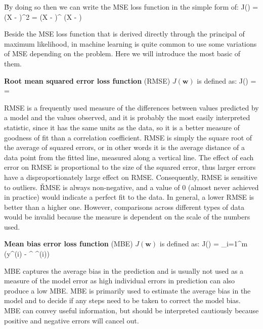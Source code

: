 \v

By doing so then we can write the MSE loss function in the simple form of:
\bse
J() =  (X  - )^2 =
 (X  - )^{\intercal} (X  - )
\ese

Beside the MSE loss function that is derived directly through the principal of maximum likelihood, in machine
learning is quite common to use some variations of MSE depending on the problem. Here we will introduce the most
basic of them.

\textbf{Root mean squared error loss function} (RMSE) $J(\boldsymbol{w})$ is defined as:
\bse
J() =  = 
\ese
\ed

RMSE is a frequently used measure of the differences between values predicted by a model and the values observed, and
it is probably the most easily interpreted statistic, since it has the same units as the data, so it is a better
measure of goodness of fit than a correlation coefficient. RMSE is simply the square root of the average of squared
errors, or in other words it is the average distance of a data point from the fitted line, measured along a vertical
line. The effect of each error on RMSE is proportional to the size of the squared error, thus larger errors have a
disproportionately large effect on RMSE. Consequently, RMSE is sensitive to outliers. \v

RMSE is always non-negative, and a value of 0 (almost never achieved in practice) would indicate a perfect fit to the
data. In general, a lower RMSE is better than a higher one. However, comparisons across different types of data would
be invalid because the measure is dependent on the scale of the numbers used.

\textbf{Mean bias error loss function} (MBE) $J(\boldsymbol{w})$ is defined as:
\bse
J() =  \sum_{i=1}^{m} (y^{(i)} - ^{\intercal} ^{(i)})
\ese
\ed

MBE captures the average bias in the prediction and is usually not used as a measure of the model error as high
individual errors in prediction can also produce a low MBE. MBE is primarily used to estimate the average bias in the
model and to decide if any steps need to be taken to correct the model bias. MBE can convey useful information, but
should be interpreted cautiously because positive and negative errors will cancel out.

